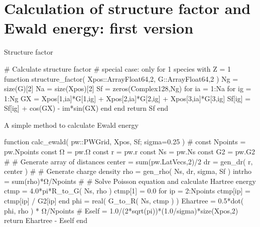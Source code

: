 \section{Calculation of structure factor and Ewald energy: first version}

Structure factor

\begin{juliacode}
# Calculate structure factor
# special case: only for 1 species with Z = 1
function structure_factor( Xpos::Array{Float64,2}, G::Array{Float64,2} )
  Ng = size(G)[2]
  Na = size(Xpos)[2]
  Sf = zeros(Complex128,Ng)
  for ia = 1:Na
    for ig = 1:Ng
      GX = Xpos[1,ia]*G[1,ig] +
           Xpos[2,ia]*G[2,ig] +
           Xpos[3,ia]*G[3,ig]
      Sf[ig] = Sf[ig] + cos(GX) - im*sin(GX)
    end
  end
  return Sf
end
\end{juliacode}

A simple method to calculate Ewald energy

\begin{juliacode}
function calc_ewald( pw::PWGrid, Xpos, Sf; sigma=0.25 )
  #
  const Npoints = pw.Npoints
  const Ω  = pw.Ω
  const r  = pw.r
  const Ns = pw.Ns
  const G2 = pw.G2
  #
  # Generate array of distances
  center = sum(pw.LatVecs,2)/2
  dr = gen_dr( r, center )
  #
  # Generate charge density
  rho = gen_rho( Ns, dr, sigma, Sf )
  intrho = sum(rho)*Ω/Npoints
  #
  # Solve Poisson equation and calculate Hartree energy
  ctmp = 4.0*pi*R_to_G( Ns, rho )
  ctmp[1] = 0.0
  for ip = 2:Npoints
    ctmp[ip] = ctmp[ip] / G2[ip]
  end
  phi = real( G_to_R( Ns, ctmp ) )
  Ehartree = 0.5*dot( phi, rho ) * Ω/Npoints
  #
  Eself = 1.0/(2*sqrt(pi))*(1.0/sigma)*size(Xpos,2)
  return Ehartree - Eself
end
\end{juliacode}
